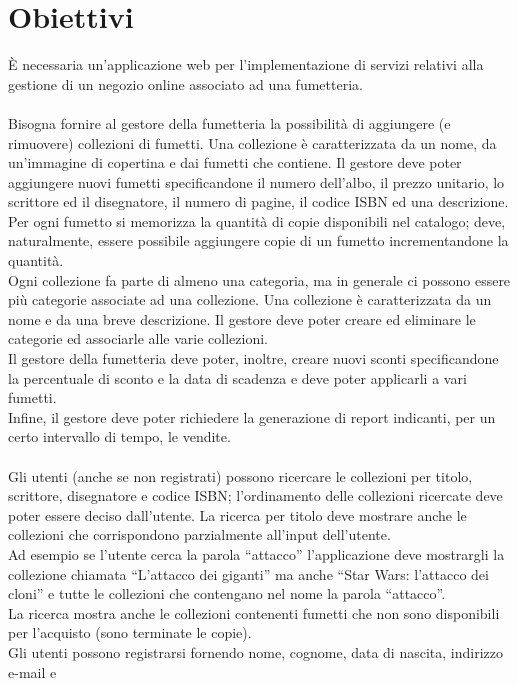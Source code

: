 \documentclass{scrreprt}
\begin{document}
\section{Obiettivi}\label{obiettivi}
È necessaria un’applicazione web per l’implementazione di servizi relativi alla
gestione di un negozio online associato ad una fumetteria.\\
\\
Bisogna fornire al gestore della fumetteria la possibilità di aggiungere (e rimuovere) collezioni
di fumetti. Una collezione è caratterizzata da un nome, da un'immagine di copertina e dai fumetti che 
contiene. Il gestore deve poter aggiungere nuovi fumetti specificandone il numero dell'albo, il prezzo
unitario, lo scrittore ed il disegnatore, il numero di pagine, il codice ISBN ed una descrizione.
Per ogni fumetto si memorizza la quantità di copie disponibili nel catalogo; deve, naturalmente, essere
possibile aggiungere copie di un fumetto incrementandone la quantità.\\
Ogni collezione fa parte di almeno una categoria, ma in generale ci possono essere più categorie associate
ad una collezione. Una collezione è caratterizzata da un nome e da una breve descrizione. Il gestore deve
poter creare ed eliminare le categorie ed associarle alle varie collezioni.\\
Il gestore della fumetteria deve poter, inoltre, creare nuovi sconti specificandone la percentuale di sconto
e la data di scadenza e deve poter applicarli a vari fumetti.\\
Infine, il gestore deve poter richiedere la generazione di report indicanti, per un certo intervallo di tempo,
le vendite.\\
\\
Gli utenti (anche se non registrati) possono ricercare le collezioni per titolo, scrittore,
disegnatore e codice ISBN; l'ordinamento delle collezioni ricercate deve poter essere deciso 
dall'utente. La ricerca per titolo deve mostrare anche le collezioni che corrispondono parzialmente 
all’input dell’utente.\\ 
Ad esempio se l’utente cerca la parola “attacco” l’applicazione deve mostrargli la collezione
chiamata “L’attacco dei giganti” ma anche “Star Wars: l’attacco dei cloni” e tutte le collezioni 
che contengano nel nome la parola “attacco”.\\
La ricerca mostra anche le collezioni contenenti fumetti che non sono disponibili per l'acquisto
(sono terminate le copie).\\
Gli utenti possono registrarsi fornendo nome, cognome, data di nascita, indirizzo e-mail e
\end{document}
